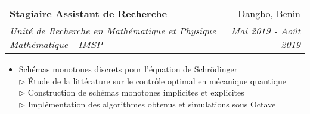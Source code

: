 \documentclass[letterpaper,11pt]{article}
\makeatletter
\newcommand{\resumeItem}[2]{
  \item\small{
    \textbf{#1}{: #2 \vspace{-2pt}}
  }
}
\newcommand{\resumeSubheading}[4]{
  \vspace{-1pt}\item
    \begin{tabular*}{0.97\textwidth}{l@{\extracolsep{\fill}}r}
      \textbf{#1} & #2 \\
      \textit{\small#3} & \textit{\small #4} \\
    \end{tabular*}\vspace{-5pt}
}
\newcommand{\resumeItemListStart}{\begin{itemize}}
\newcommand{\resumeItemListEnd}{\end{itemize}\vspace{-5pt}}
\makeatother
\begin{document}
      \resumeSubheading
	  {Stagiaire Assistant de Recherche}{Dangbo, Benin}
	  {Unité de Recherche en Mathématique et Physique Mathématique - IMSP}{Mai 2019 - Août 2019}
	  \resumeItemListStart
	  \item{Schémas monotones discrets pour l'équation de Schrödinger
	  \\{$\rhd$ \small{Étude de la littérature sur le contrôle optimal en mécanique quantique
	  \\$\rhd$ Construction de schémas monotones implicites et explicites
	  \\$\rhd$ Implémentation des algorithmes obtenus et simulations sous Octave}}}
	  \resumeItemListEnd


      

\end{document}
